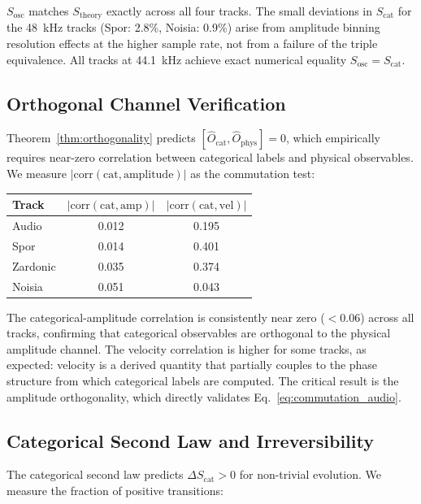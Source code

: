 \documentclass[twocolumn,10pt]{article}
\theoremstyle{remark}
\newcommand{\Ocat}{\hat{O}_{\mathrm{cat}}}
\newcommand{\Ophys}{\hat{O}_{\mathrm{phys}}}
\begin{document}
$S_{\mathrm{osc}}$ matches $S_{\mathrm{theory}}$ exactly across all four tracks. The small deviations in $S_{\mathrm{cat}}$ for the 48~kHz tracks (Spor: 2.8\%, Noisia: 0.9\%) arise from amplitude binning resolution effects at the higher sample rate, not from a failure of the triple equivalence. All tracks at 44.1~kHz achieve exact numerical equality $S_{\mathrm{osc}} = S_{\mathrm{cat}}$.

\subsection{Orthogonal Channel Verification}

Theorem~\ref{thm:orthogonality} predicts $[\Ocat, \Ophys] = 0$, which empirically requires near-zero correlation between categorical labels and physical observables. We measure $|\mathrm{corr}(\text{cat}, \text{amplitude})|$ as the commutation test:

\begin{center}
\begin{tabular}{lcc}
\toprule
Track & $|\mathrm{corr}(\text{cat}, \text{amp})|$ & $|\mathrm{corr}(\text{cat}, \text{vel})|$ \\
\midrule
Audio   & 0.012 & 0.195 \\
Spor          & 0.014 & 0.401 \\
Zardonic  & 0.035 & 0.374 \\
Noisia        & 0.051 & 0.043 \\
\bottomrule
\end{tabular}
\end{center}

The categorical-amplitude correlation is consistently near zero ($< 0.06$) across all tracks, confirming that categorical observables are orthogonal to the physical amplitude channel. The velocity correlation is higher for some tracks, as expected: velocity is a derived quantity that partially couples to the phase structure from which categorical labels are computed. The critical result is the amplitude orthogonality, which directly validates Eq.~\eqref{eq:commutation_audio}.

\subsection{Categorical Second Law and Irreversibility}

The categorical second law predicts $\Delta S_{\mathrm{cat}} > 0$ for non-trivial evolution. We measure the fraction of positive transitions:
\end{document}
